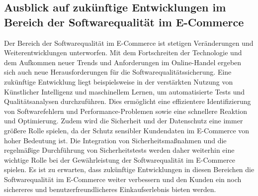 \subsection{Ausblick auf zukünftige Entwicklungen im Bereich der Softwarequalität im E-Commerce}
Der Bereich der Softwarequalität im E-Commerce ist stetigen Veränderungen und Weiterentwicklungen unterworfen. Mit dem Fortschreiten der Technologie und dem Aufkommen neuer Trends und Anforderungen im Online-Handel ergeben sich auch neue Herausforderungen für die Softwarequalitätssicherung. Eine zukünftige Entwicklung liegt beispielsweise in der verstärkten Nutzung von Künstlicher Intelligenz und maschinellem Lernen, um automatisierte Tests und Qualitätsanalysen durchzuführen. Dies ermöglicht eine effizientere Identifizierung von Softwarefehlern und Performance-Problemen sowie eine schnellere Reaktion und Optimierung. Zudem wird die Sicherheit und der Datenschutz eine immer größere Rolle spielen, da der Schutz sensibler Kundendaten im E-Commerce von hoher Bedeutung ist. Die Integration von Sicherheitsmaßnahmen und die regelmäßige Durchführung von Sicherheitstests werden daher weiterhin eine wichtige Rolle bei der Gewährleistung der Softwarequalität im E-Commerce spielen. Es ist zu erwarten, dass zukünftige Entwicklungen in diesen Bereichen die Softwarequalität im E-Commerce weiter verbessern und den Kunden ein noch sichereres und benutzerfreundlicheres Einkaufserlebnis bieten werden.